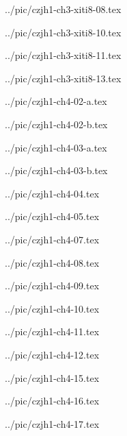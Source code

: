 ../pic/czjh1-ch3-xiti8-08.tex



../pic/czjh1-ch3-xiti8-10.tex



../pic/czjh1-ch3-xiti8-11.tex



../pic/czjh1-ch3-xiti8-13.tex



../pic/czjh1-ch4-02-a.tex



../pic/czjh1-ch4-02-b.tex



../pic/czjh1-ch4-03-a.tex



../pic/czjh1-ch4-03-b.tex



../pic/czjh1-ch4-04.tex



../pic/czjh1-ch4-05.tex



../pic/czjh1-ch4-07.tex



../pic/czjh1-ch4-08.tex



../pic/czjh1-ch4-09.tex



../pic/czjh1-ch4-10.tex



../pic/czjh1-ch4-11.tex



../pic/czjh1-ch4-12.tex



../pic/czjh1-ch4-15.tex



../pic/czjh1-ch4-16.tex



../pic/czjh1-ch4-17.tex

